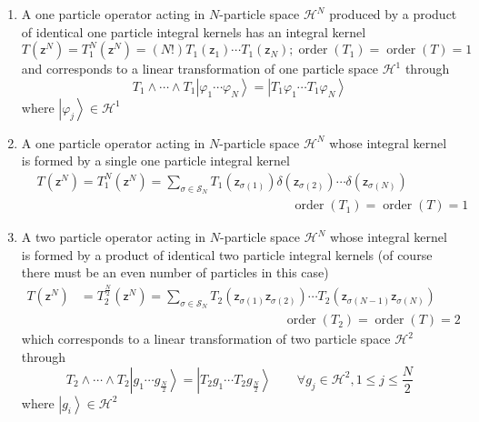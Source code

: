 \documentclass[aps,preprint]{revtex4}%
\begin{document}
\begin{enumerate}
\item A one particle operator acting in $N$-particle space $\mathcal{H}^{N}$
produced by a product of identical one particle integral kernels has an
integral kernel
\begin{equation}
T\left(  \mathsf{z}^{N}\right)  =T_{1}^{N}\left(  \mathsf{z}^{N}\right)
=\left(  N!\right)  T_{1}\left(  \mathsf{z}_{1}\right)  \cdots T_{1}\left(
\mathsf{z}_{N}\right)  ;\operatorname{order}\left(  T_{1}\right)
=\operatorname{order}\left(  T\right)  =1
\end{equation}
and corresponds to a linear transformation of one particle space
$\mathcal{H}^{1}$ through%
\begin{equation}
T_{1}\wedge\cdots\wedge T_{1}\left\vert \varphi_{1}\cdots\varphi
_{N}\right\rangle =\left\vert T_{1}\varphi_{1}\cdots T_{1}\varphi
_{N}\right\rangle
\end{equation}
where $\left\vert \varphi_{j}\right\rangle \in\mathcal{H}^{1}$

\item A one particle operator acting in $N$-particle space $\mathcal{H}^{N}$
whose integral kernel is formed by a single one particle integral kernel
\begin{align}
&  T\left(  \mathsf{z}^{N}\right)  =T_{1}^{N}\left(  \mathsf{z}^{N}\right)
=\sum_{\sigma\in\mathcal{S}_{N}}T_{1}\left(  \mathsf{z}_{\sigma\left(
1\right)  }\right)  \delta\left(  \mathsf{z}_{\sigma\left(  2\right)
}\right)  \cdots\delta\left(  \mathsf{z}_{\sigma\left(  N\right)  }\right)
\nonumber\\
&  \qquad\qquad\qquad\qquad\qquad\qquad\qquad\qquad\qquad\qquad
\operatorname{order}\left(  T_{1}\right)  =\operatorname{order}\left(
T\right)  =1
\end{align}


\item A two particle operator acting in $N$-particle space $\mathcal{H}^{N}$
whose integral kernel is formed by a product of identical two particle
integral kernels (of course there must be an even number of particles in this
case)
\begin{align}
T\left(  \mathsf{z}^{N}\right)   &  =T_{2}^{\frac{N}{2}}\left(  \mathsf{z}%
^{N}\right)  =\sum_{\sigma\in\mathcal{S}_{N}}T_{2}\left(  \mathsf{z}%
_{\sigma\left(  1\right)  }\mathsf{z}_{\sigma\left(  2\right)  }\right)
\cdots T_{2}\left(  \mathsf{z}_{\sigma\left(  N-1\right)  }\mathsf{z}%
_{\sigma\left(  N\right)  }\right) \nonumber\\
&  \qquad\qquad\qquad\qquad\qquad\qquad\qquad\qquad\operatorname{order}\left(
T_{2}\right)  =\operatorname{order}\left(  T\right)  =2
\end{align}
which corresponds to a linear transformation of two particle space
$\mathcal{H}^{2}$ through%
\begin{equation}
T_{2}\wedge\cdots\wedge T_{2}\left\vert g_{1}\cdots g_{\frac{N}{2}%
}\right\rangle =\left\vert T_{2}g_{1}\cdots T_{2}g_{\frac{N}{2}}\right\rangle
\qquad\forall g_{j}\in\mathcal{H}^{2},1\leq j\leq\frac{N}{2}%
\end{equation}
where $\left\vert g_{i}\right\rangle \in\mathcal{H}^{2}$


\end{enumerate}
\end{document}

